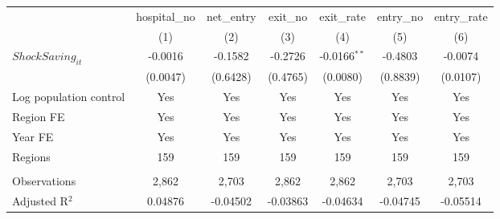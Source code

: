 \begingroup
\centering
\begin{tabular}{lcccccc}
   \toprule
                          & hospital\_no  & net\_entry  & exit\_no  & exit\_rate     & entry\_no  & entry\_rate \\    
                          & (1)           & (2)         & (3)       & (4)            & (5)        & (6)\\  
   \midrule 
   $ShockSaving_{it}$     & -0.0016       & -0.1582     & -0.2726   & -0.0166$^{**}$ & -0.4803    & -0.0074\\   
                          & (0.0047)      & (0.6428)    & (0.4765)  & (0.0080)       & (0.8839)   & (0.0107)\\   
   Log population control & Yes           & Yes         & Yes       & Yes            & Yes        & Yes\\  
   Region FE              & Yes           & Yes         & Yes       & Yes            & Yes        & Yes\\  
   Year FE                & Yes           & Yes         & Yes       & Yes            & Yes        & Yes\\  
   Regions                & 159           & 159         & 159       & 159            & 159        & 159\\  
    \\
   Observations           & 2,862         & 2,703       & 2,862     & 2,862          & 2,703      & 2,703\\  
   Adjusted R$^2$         & 0.04876       & -0.04502    & -0.03863  & -0.04634       & -0.04745   & -0.05514\\  
   \bottomrule
\end{tabular}
\par\endgroup
